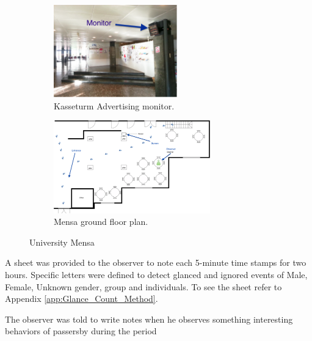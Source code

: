 

\begin{figure}[H]
\centering
    \begin{subfigure}[H]{0.45\textwidth}
        \centering
        \includegraphics[width=\textwidth,height=4cm]{Figures/3/Kasseturm_monitor}
        \caption{Kasseturm Advertising monitor.}
        \label{fig:kasseturm}
    \end{subfigure}
    \begin{subfigure}[H]{0.45\textwidth}
        \centering
        \includegraphics[width=\textwidth,height=4cm]{Figures/3/mensa_setup}
        \caption{Mensa ground floor plan.}
        \label{fig:mensasetup}
    \end{subfigure}
    \caption{University Mensa }
    \label{fig:observation_env}
\end{figure}


A sheet was provided to the observer to note each 5-minute time stamps for two hours. Specific letters were defined to detect glanced and ignored events of Male, Female, Unknown gender, group and individuals. To see the sheet refer to Appendix \ref{app:Glance_Count_Method}.

The observer was told to write notes when he observes something interesting behaviors of passersby during the period



